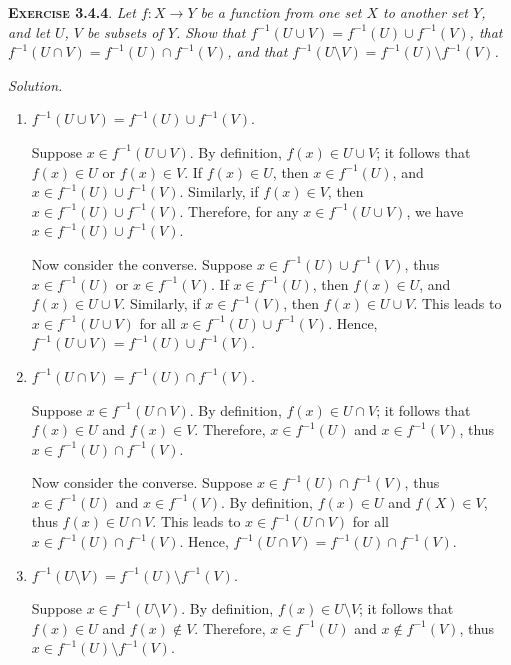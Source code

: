 \documentclass[12pt]{article}
\theoremstyle{remark}
\newenvironment{exer}[2]{
    \noindent \setlength{\parskip}{1em}%
    \textsc{\textbf{Exercise #1}}. \textit{#2} \par
    \noindent \textit{Solution.} %
}{\bigskip}
\begin{document}
\begin{exer}{3.4.4}{
    Let $f : X \to Y$ be a function from one set $X$ to another set $Y$, and let $U$, $V$ be subsets of $Y$.
    Show that $f^{-1}(U \cup V) = f^{-1}(U) \cup f^{-1}(V)$,
    that $f^{-1}(U \cap V) = f^{-1}(U) \cap f^{-1}(V)$,
    and that $f^{-1}(U \setminus V) = f^{-1}(U) \setminus f^{-1}(V)$.
}
    \begin{enumerate}[topsep=0mm, label=(\alph*)]
        \item $f^{-1}(U \cup V) = f^{-1}(U) \cup f^{-1}(V)$.
        
            Suppose $x \in f^{-1}(U \cup V)$.
            By definition, $f(x) \in U \cup V$; it follows that $f(x) \in U$ or $f(x) \in V$.
            If $f(x) \in U$, then $x \in f^{-1}(U)$, and $x \in f^{-1}(U) \cup f^{-1}(V)$.
            Similarly, if $f(x) \in V$, then $x \in f^{-1}(U) \cup f^{-1}(V)$.
            Therefore, for any $x \in f^{-1}(U \cup V)$, we have $x \in f^{-1}(U) \cup f^{-1}(V)$.
            
            Now consider the converse.
            Suppose $x \in f^{-1}(U) \cup f^{-1}(V)$, thus $x \in f^{-1}(U)$ or $x \in f^{-1}(V)$.
            If $x \in f^{-1}(U)$, then $f(x) \in U$, and $f(x) \in U \cup V$.
            Similarly, if $x \in f^{-1}(V)$, then $f(x) \in U \cup V$.
            This leads to $x \in f^{-1}(U \cup V)$ for all $x \in f^{-1}(U) \cup f^{-1}(V)$.
            Hence, $f^{-1}(U \cup V) = f^{-1}(U) \cup f^{-1}(V)$.         
        
        \item $f^{-1}(U \cap V) = f^{-1}(U) \cap f^{-1}(V)$.

            Suppose $x \in f^{-1}(U \cap V)$.
            By definition, $f(x) \in U \cap V$; it follows that $f(x) \in U$ and $f(x) \in V$.
            Therefore, $x \in f^{-1}(U)$ and $x \in f^{-1}(V)$, thus $x \in f^{-1}(U) \cap f^{-1}(V)$.
            
            Now consider the converse.
            Suppose $x \in f^{-1}(U) \cap f^{-1}(V)$, thus $x \in f^{-1}(U)$ and $x \in f^{-1}(V)$.
            By definition, $f(x) \in U$ and $f(X) \in V$, thus $f(x) \in U \cap V$.
            This leads to $x \in f^{-1}(U \cap V)$ for all $x \in f^{-1}(U) \cap f^{-1}(V)$.
            Hence, $f^{-1}(U \cap V) = f^{-1}(U) \cap f^{-1}(V)$.            
        
        \item $f^{-1}(U \setminus V) = f^{-1}(U) \setminus f^{-1}(V)$.

            Suppose $x \in f^{-1}(U \setminus V)$.
            By definition, $f(x) \in U \setminus V$; it follows that $f(x) \in U$ and $f(x) \notin V$.
            Therefore, $x \in f^{-1}(U)$ and $x \notin f^{-1}(V)$, thus $x \in f^{-1}(U) \setminus f^{-1}(V)$.
            

\end{enumerate}
\end{exer}
\end{document}
